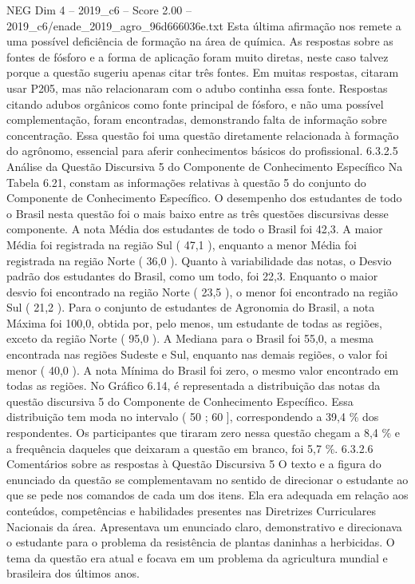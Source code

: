 \begin{textsample}{NEG Dim 4 – 2019\_c6 – Score 2.00 – 2019\_c6/enade\_2019\_agro\_96d666036e.txt}
Esta última afirmação nos remete a uma possível deficiência de formação na área de química.
As respostas sobre as fontes de fósforo e a forma de aplicação foram muito diretas, neste caso talvez porque a questão sugeriu apenas citar três fontes.
Em muitas respostas, citaram usar P205, mas não relacionaram com o adubo continha essa fonte.
Respostas citando adubos orgânicos como fonte principal de fósforo, e não uma possível complementação, foram encontradas, demonstrando falta de informação sobre concentração.
Essa questão foi uma questão diretamente relacionada à formação do agrônomo, essencial para aferir conhecimentos básicos do profissional. 6.3.2.5 Análise da Questão Discursiva 5 do Componente de Conhecimento Específico Na Tabela 6.21, constam as informações relativas à questão 5 do conjunto do Componente de Conhecimento Específico.
O desempenho dos estudantes de todo o Brasil nesta questão foi o mais baixo entre as três questões discursivas desse componente.
A nota Média dos estudantes de todo o Brasil foi 42,3.
A maior Média foi registrada na região Sul ( 47,1 ), enquanto a menor Média foi registrada na região Norte ( 36,0 ).
Quanto à variabilidade das notas, o Desvio padrão dos estudantes do Brasil, como um todo, foi 22,3.
Enquanto o maior desvio foi encontrado na região Norte ( 23,5 ), o menor foi encontrado na região Sul ( 21,2 ).
Para o conjunto de estudantes de Agronomia do Brasil, a nota Máxima foi 100,0, obtida por, pelo menos, um estudante de todas as regiões, exceto da região Norte ( 95,0 ).
A Mediana para o Brasil foi 55,0, a mesma encontrada nas regiões Sudeste e Sul, enquanto nas demais regiões, o valor foi menor ( 40,0 ).
A nota Mínima do Brasil foi zero, o mesmo valor encontrado em todas as regiões.
No Gráfico 6.14, é representada a distribuição das notas da questão discursiva 5 do Componente de Conhecimento Específico.
Essa distribuição tem moda no intervalo ( 50 ; 60 ], correspondendo a 39,4 \% dos respondentes.
Os participantes que tiraram zero nessa questão chegam a 8,4 \% e a frequência daqueles que deixaram a questão em branco, foi 5,7 \%. 6.3.2.6 Comentários sobre as respostas à Questão Discursiva 5 O texto e a figura do enunciado da questão se complementavam no sentido de direcionar o estudante ao que se pede nos comandos de cada um dos itens.
Ela era adequada em relação aos conteúdos, competências e habilidades presentes nas Diretrizes Curriculares Nacionais da área.
Apresentava um enunciado claro, demonstrativo e direcionava o estudante para o problema da resistência de plantas daninhas a herbicidas.
O tema da questão era atual e focava em um problema da agricultura mundial e brasileira dos últimos anos.

\end{textsample}
